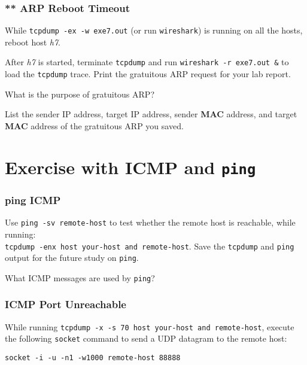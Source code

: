 \documentclass{../UTNetLab}
\begin{document}
\section{** ARP Reboot Timeout}
    While \lstinline{tcpdump -ex -w exe7.out} (or run \lstinline{wireshark}) is running on all the hosts, reboot host \textit{h7}. 

    After \textit{h7} is started, terminate \lstinline{tcpdump} and run \lstinline{wireshark -r exe7.out &} to load the \lstinline{tcpdump} trace.
    Print the gratuitous ARP request for your lab report.
    
    \begin{report}
    \item What is the purpose of gratuitous ARP?

    \item List the sender IP address, target IP address, sender \textbf{MAC} address, and target \textbf{MAC} address of the gratuitous ARP you saved.
    \end{report}


\part{Exercise with ICMP and \texttt{ping}}\label{sec:icmp-ping}
\section{ping ICMP}
    Use \lstinline[emph={remote-host}]{ping -sv remote-host} to test whether the remote host is reachable, while running:
    \\\lstinline[emph={your-host, remote-host}]{tcpdump -enx host your-host and remote-host}.
    Save the \lstinline{tcpdump} and \lstinline{ping} output for the future study on \lstinline{ping}.
    
    \begin{report}
    \item What ICMP messages are used by \lstinline{ping}?
    \end{report}

\section{ICMP Port Unreachable}
    While running \lstinline[emph={your-host, remote-host}]{tcpdump -x -s 70 host your-host and remote-host}, execute the following \lstinline{socket} command to send a UDP datagram to the remote host:

    \begin{lstlisting}[emph={your-host, remote-host}]
socket -i -u -n1 -w1000 remote-host 88888
    \end{lstlisting}
\end{document}
